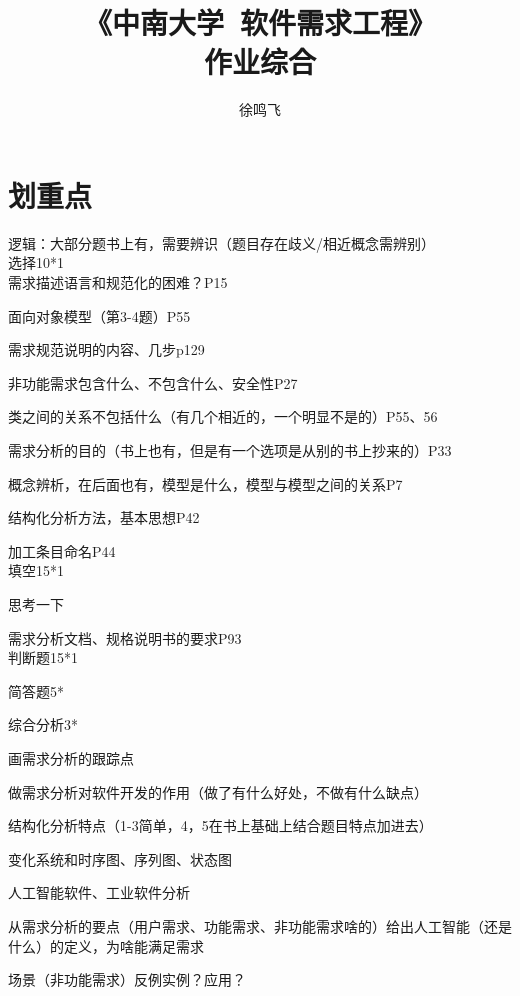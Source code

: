 \documentclass[11pt, a4paper, oneside]{ctexbook}
\title{{\Huge{\textbf{《中南大学\ 软件需求工程》}}}\\作业综合}
\author{徐鸣飞}
\date{}
\begin{document}
\maketitle
{}
\setcounter{page}{1}
\newpage
{}
\setcounter{page}{1}
\tableofcontents
\newpage
\setcounter{page}{1}
\section*{划重点}
逻辑：大部分题书上有，需要辨识（题目存在歧义/相近概念需辨别）
\\

选择10*1
\\

需求描述语言和规范化的困难？P15

面向对象模型（第3-4题）P55

需求规范说明的内容、几步p129

非功能需求包含什么、不包含什么、安全性P27

类之间的关系不包括什么（有几个相近的，一个明显不是的）P55、56

需求分析的目的（书上也有，但是有一个选项是从别的书上抄来的）P33

概念辨析，在后面也有，模型是什么，模型与模型之间的关系P7

结构化分析方法，基本思想P42

加工条目命名P44
\\

填空15*1

思考一下

需求分析文档、规格说明书的要求P93
\\

判断题15*1

简答题5*

综合分析3*

画需求分析的跟踪点

做需求分析对软件开发的作用（做了有什么好处，不做有什么缺点）

结构化分析特点（1-3简单，4，5在书上基础上结合题目特点加进去）

变化系统和时序图、序列图、状态图

人工智能软件、工业软件分析

从需求分析的要点（用户需求、功能需求、非功能需求啥的）给出人工智能（还是什么）的定义，为啥能满足需求

场景（非功能需求）反例实例？应用？
\end{document}
